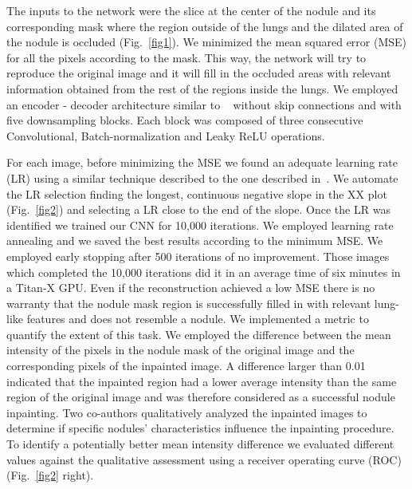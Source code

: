 \documentclass[runningheads]{llncs}
\begin{document}
The inputs to the network were the slice at the center of the nodule and its corresponding mask where the region outside of the lungs and the dilated area of the nodule is occluded (Fig.~\ref{fig1}). We minimized the mean squared error (MSE) for all the pixels according to the mask. This way, the network will try to reproduce the original image and it will fill in the occluded areas with relevant information obtained from the rest of the regions inside the lungs. We employed an encoder - decoder architecture similar to ~\cite{DBLP:journals/corr/abs-1711-10925} without skip connections and with five downsampling blocks. Each block was composed of three consecutive Convolutional, Batch-normalization and Leaky ReLU operations.

For each image, before minimizing the MSE we found an adequate learning rate (LR) using a similar technique described to the one described in~\cite{DBLP:journals/corr/Smith15a}. We automate the LR selection finding the longest, continuous negative slope in the XX plot (Fig.~\ref{fig2}) and selecting a LR close to the end of the slope.  Once the LR was identified we trained our CNN for 10,000 iterations. We employed learning rate annealing and we saved the best results according to the minimum MSE. We employed early stopping after 500 iterations of no improvement. Those images which completed the 10,000 iterations did it in an average time of six minutes in a Titan-X GPU. Even if the reconstruction achieved a low MSE there is no warranty that the nodule mask region is successfully filled in with relevant lung-like features and does not resemble a nodule. We implemented a metric to quantify the extent of this task. We employed the difference between the mean intensity of the pixels in the nodule mask of the original image and the corresponding pixels of the inpainted image. A difference larger than 0.01 indicated that the inpainted region had a  lower average intensity than the same region of the original image and was therefore considered as a successful nodule inpainting. Two co-authors qualitatively analyzed the inpainted images to determine if specific nodules' characteristics influence the inpainting procedure. To identify a potentially better mean intensity difference we evaluated different values against the qualitative assessment using a receiver operating curve (ROC) (Fig.~\ref{fig2} right).
\end{document}
